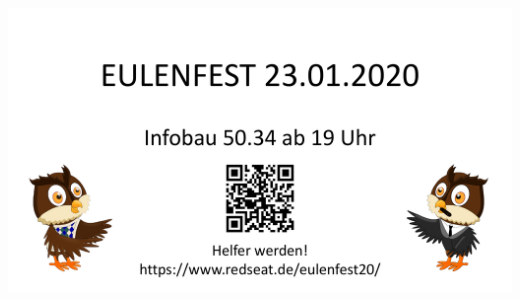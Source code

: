 \section{}
\includegraphics[width=1\textwidth]{../figures/EulenfestWerbung.pdf}
\questionframe
\lastframe
{}

